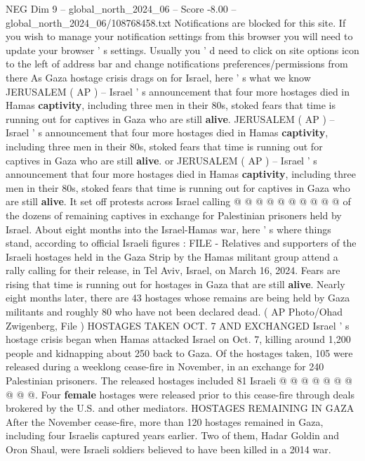 \begin{textsample}{NEG Dim 9 – global\_north\_2024\_06 – Score -8.00 – global\_north\_2024\_06/108768458.txt}  \label{ex:f9_neg_164}
Notifications are blocked for this site.
If you wish to manage your notification settings from this browser you will need to update your browser ' s settings.
Usually you ' d need to click on site options icon to the left of address bar and change notifications preferences/permissions from there As Gaza hostage crisis drags on for Israel, here ' s what we know JERUSALEM ( AP ) -- Israel ' s announcement that four more hostages died in Hamas \textbf{captivity}, including three men in their 80s, stoked fears that time is running out for captives in Gaza who are still \textbf{alive}.
JERUSALEM ( AP ) -- Israel ' s announcement that four more hostages died in Hamas \textbf{captivity}, including three men in their 80s, stoked fears that time is running out for captives in Gaza who are still \textbf{alive}. or JERUSALEM ( AP ) -- Israel ' s announcement that four more hostages died in Hamas \textbf{captivity}, including three men in their 80s, stoked fears that time is running out for captives in Gaza who are still \textbf{alive}.
It set off protests across Israel calling @ @ @ @ @ @ @ @ @ @ of the dozens of remaining captives in exchange for Palestinian prisoners held by Israel.
About eight months into the Israel-Hamas war, here ' s where things stand, according to official Israeli figures : FILE - Relatives and supporters of the Israeli hostages held in the Gaza Strip by the Hamas militant group attend a rally calling for their release, in Tel Aviv, Israel, on March 16, 2024.
Fears are rising that time is running out for hostages in Gaza that are still \textbf{alive}.
Nearly eight months later, there are 43 hostages whose remains are being held by Gaza militants and roughly 80 who have not been declared dead. ( AP Photo/Ohad Zwigenberg, File ) HOSTAGES TAKEN OCT. 7 AND EXCHANGED Israel ' s hostage crisis began when Hamas attacked Israel on Oct. 7, killing around 1,200 people and kidnapping about 250 back to Gaza.
Of the hostages taken, 105 were released during a weeklong cease-fire in November, in an exchange for 240 Palestinian prisoners.
The released hostages included 81 Israeli @ @ @ @ @ @ @ @ @ @.
Four \textbf{female} hostages were released prior to this cease-fire through deals brokered by the U.S. and other mediators.
HOSTAGES REMAINING IN GAZA After the November cease-fire, more than 120 hostages remained in Gaza, including four Israelis captured years earlier.
Two of them, Hadar Goldin and Oron Shaul, were Israeli soldiers believed to have been killed in a 2014 war.

\end{textsample}
